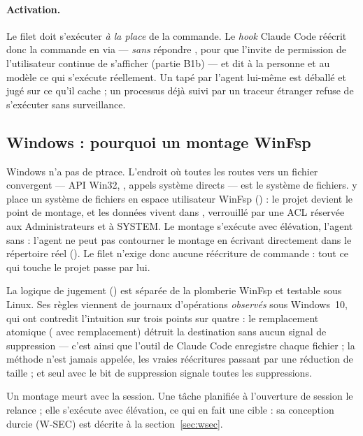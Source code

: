 \paragraph{Activation.} Le filet doit s'exécuter \emph{à la place} de la commande. Le
\textit{hook} Claude Code réécrit donc la commande en 
via  --- \emph{sans} répondre , pour que l'invite de permission
de l'utilisateur continue de s'afficher (partie B1b) --- et dit à la personne et au modèle ce
qui s'exécute réellement. Un  tapé par l'agent lui-même est déballé et jugé
sur ce qu'il cache ; un processus déjà suivi par un traceur étranger refuse de s'exécuter
sans surveillance.

\subsection{Windows : pourquoi un montage WinFsp}
Windows n'a pas de ptrace. L'endroit où toutes les routes vers un fichier convergent --- API
Win32, , appels système directs --- est le système de fichiers. \demo{} y place un
système de fichiers en espace utilisateur WinFsp () : le projet
 devient le point de montage, et les données vivent dans
, verrouillé par une ACL réservée aux Administrateurs et à
SYSTEM. Le montage s'exécute avec élévation, l'agent sans : l'agent ne peut pas contourner le
montage en écrivant directement dans le répertoire réel (). Le filet
n'exige donc aucune réécriture de commande : tout ce qui touche le projet passe par lui.

La logique de jugement () est séparée de la plomberie WinFsp et testable
sous Linux. Ses règles viennent de journaux d'opérations \emph{observés} sous Windows~10,
qui ont contredit l'intuition sur trois points sur quatre : le remplacement atomique
( avec remplacement) détruit la destination sans aucun signal de suppression ---
c'est ainsi que l'outil  de Claude Code enregistre chaque fichier ; la méthode
 n'est jamais appelée, les vraies réécritures passant par une réduction de
taille ; et seul  avec le bit de suppression signale toutes les suppressions.

Un montage meurt avec la session. Une tâche planifiée à l'ouverture de session le relance ;
elle s'exécute avec élévation, ce qui en fait une cible : sa conception durcie (W-SEC) est
décrite à la section~\ref{sec:wsec}.

